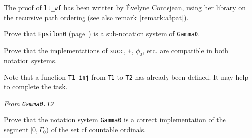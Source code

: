 \begin{remark}
The proof of \texttt{lt\_wf} has been written by \'Evelyne Contejean, using her library on the recursive path ordering (see also remark~\vref{remark:a3pat}).
\end{remark}

\begin{project}
Prove that \texttt{Epsilon0} (page~\pageref{instance-epsilon0})
is a sub-notation system of \texttt{Gamma0}.

Prove that the implementations of \texttt{succ}, \texttt{+}, $\phi_0$, etc.
are compatible in both notation systems.

Note that a function \texttt{T1\_inj} from \texttt{T1} to \texttt{T2} has already been defined. It may help to complete the task.



\noindent\emph{From \href{../theories/html/hydras.Gamma0.T2.html\#T1_to_T2}%
{\texttt{Gamma0.T2}}}



\end{project}

\begin{project}
Prove that the notation system \texttt{Gamma0} is a correct implementation 
of the segment $[0,\Gamma_0)$ of the set of countable ordinals.
\end{project}





